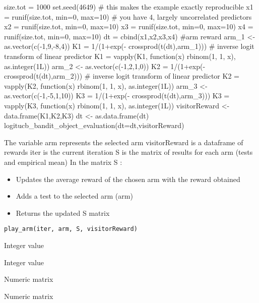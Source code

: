 \documentclass[letterpaper]{book}
\begin{document}
\begin{Examples}
\begin{ExampleCode}
size.tot = 1000
set.seed(4649)                          # this makes the example exactly reproducible
x1 = runif(size.tot, min=0, max=10)          # you have 4, largely uncorrelated predictors
x2 = runif(size.tot, min=0, max=10)
x3 = runif(size.tot, min=0, max=10)
x4 = runif(size.tot, min=0, max=10)
dt = cbind(x1,x2,x3,x4)
#arm reward
arm_1 <-  as.vector(c(-1,9,-8,4))
K1 = 1/(1+exp(- crossprod(t(dt),arm_1))) # inverse logit transform of linear predictor
K1 = vapply(K1, function(x) rbinom(1, 1, x), as.integer(1L))
arm_2 <-  as.vector(c(-1,2,1,0))
K2 = 1/(1+exp(- crossprod(t(dt),arm_2))) # inverse logit transform of linear predictor
K2 = vapply(K2, function(x) rbinom(1, 1, x), as.integer(1L))
arm_3 <-  as.vector(c(-1,-5,1,10))
K3 = 1/(1+exp(- crossprod(t(dt),arm_3)))
K3 = vapply(K3, function(x) rbinom(1, 1, x), as.integer(1L))
visitorReward <-  data.frame(K1,K2,K3)
dt <- as.data.frame(dt)
logitucb_bandit_object_evaluation(dt=dt,visitorReward)
\end{ExampleCode}
\end{Examples}
%
\begin{Description}\relax
The variable arm represents the selected arm
visitorReward is a dataframe of rewards
iter is the current iteration
S is the matrix of results for each arm (tests and empirical mean)
In the matrix S :
\begin{itemize}
 Retrieves the reward associated with the iter instant in the reward dataframe
\item Updates the average reward of the chosen arm with the reward obtained
\item Adds a test to the selected arm (arm)
\item Returns the updated S matrix

\end{itemize}

\end{Description}
%
\begin{Usage}
\begin{verbatim}
play_arm(iter, arm, S, visitorReward)
\end{verbatim}
\end{Usage}
%
\begin{Arguments}
\begin{ldescription}
\item[\code{iter}] Integer value

\item[\code{arm}] Integer value

\item[\code{S}] Numeric matrix

\item[\code{visitorReward}] Numeric matrix
\end{ldescription}
\end{Arguments}
\end{document}
